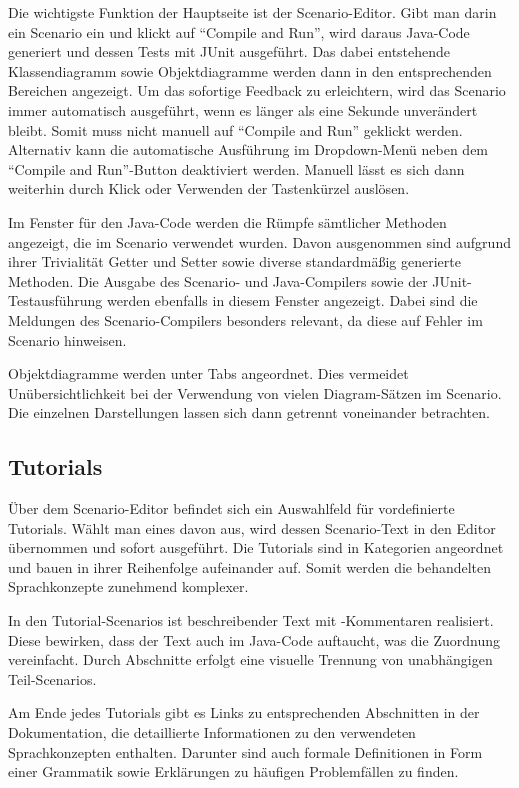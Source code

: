Die wichtigste Funktion der Hauptseite ist der Scenario-Editor.
Gibt man darin ein Scenario ein und klickt auf ``Compile and Run'',
wird daraus Java-Code generiert und dessen Tests mit JUnit ausgeführt.
Das dabei entstehende Klassendiagramm sowie Objektdiagramme werden dann in den entsprechenden Bereichen angezeigt.
Um das sofortige Feedback zu erleichtern, wird das Scenario immer automatisch ausgeführt, wenn es länger als eine Sekunde unverändert bleibt.
Somit muss nicht manuell auf ``Compile and Run'' geklickt werden.
Alternativ kann die automatische Ausführung im Dropdown-Menü neben dem ``Compile and Run''-Button deaktiviert werden.
Manuell lässt es sich dann weiterhin durch Klick oder Verwenden der Tastenkürzel auslösen.

Im Fenster für den Java-Code werden die Rümpfe sämtlicher Methoden angezeigt, die im Scenario verwendet wurden.
Davon ausgenommen sind aufgrund ihrer Trivialität Getter und Setter sowie diverse standardmäßig generierte Methoden.
Die Ausgabe des Scenario- und Java-Compilers sowie der JUnit-Testausführung werden ebenfalls in diesem Fenster angezeigt.
Dabei sind die Meldungen des Scenario-Compilers besonders relevant, da diese auf Fehler im Scenario hinweisen.

Objektdiagramme werden unter Tabs angeordnet.
Dies vermeidet Unübersichtlichkeit bei der Verwendung von vielen Diagram-Sätzen im Scenario.
Die einzelnen Darstellungen lassen sich dann getrennt voneinander betrachten.

\subsection{Tutorials}\label{subsec:tutorials}

Über dem Scenario-Editor befindet sich ein Auswahlfeld für vordefinierte Tutorials.
Wählt man eines davon aus, wird dessen Scenario-Text in den Editor übernommen und sofort ausgeführt.
Die Tutorials sind in Kategorien angeordnet und bauen in ihrer Reihenfolge aufeinander auf.
Somit werden die behandelten Sprachkonzepte zunehmend komplexer.

In den Tutorial-Scenarios ist beschreibender Text mit \code{//}-Kommentaren realisiert.
Diese bewirken, dass der Text auch im Java-Code auftaucht, was die Zuordnung vereinfacht.
Durch Abschnitte erfolgt eine visuelle Trennung von unabhängigen Teil-Scenarios.

Am Ende jedes Tutorials gibt es Links zu entsprechenden Abschnitten in der Dokumentation,
die detaillierte Informationen zu den verwendeten Sprachkonzepten enthalten.
Darunter sind auch formale Definitionen in Form einer Grammatik sowie Erklärungen zu häufigen Problemfällen zu finden.

